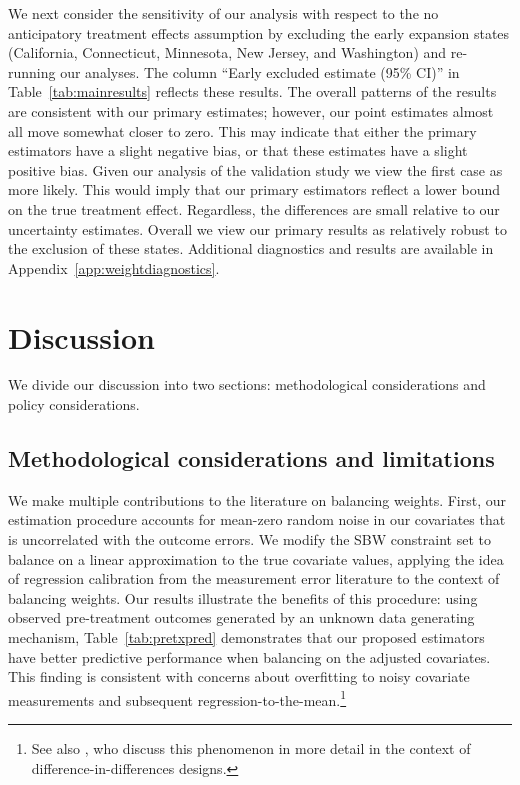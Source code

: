 \documentclass[aoas]{imsart}
\theoremstyle{plain}
\theoremstyle{remark}
\begin{document}
We next consider the sensitivity of our analysis with respect to the no anticipatory treatment effects assumption by excluding the early expansion states (California, Connecticut, Minnesota, New Jersey, and Washington) and re-running our analyses. The column ``Early excluded estimate (95\% CI)'' in Table~\ref{tab:mainresults} reflects these results. The overall patterns of the results are consistent with our primary estimates; however, our point estimates almost all move somewhat closer to zero. This may indicate that either the primary estimators have a slight negative bias, or that these estimates have a slight positive bias. Given our analysis of the validation study we view the first case as more likely. This would imply that our primary estimators reflect a lower bound on the true treatment effect. Regardless, the differences are small relative to our uncertainty estimates. Overall we view our primary results as relatively robust to the exclusion of these states. Additional diagnostics and results are available in Appendix~\ref{app:weightdiagnostics}.

\section{Discussion}

We divide our discussion into two sections: methodological considerations and policy considerations. 

\subsection{Methodological considerations and limitations}

We make multiple contributions to the literature on balancing weights. First, our estimation procedure accounts for mean-zero random noise in our covariates that is uncorrelated with the outcome errors. We modify the SBW constraint set to balance on a linear approximation to the true covariate values, applying the idea of regression calibration from the measurement error literature to the context of balancing weights. Our results illustrate the benefits of this procedure: using observed pre-treatment outcomes generated by an unknown data generating mechanism, Table~\ref{tab:pretxpred} demonstrates that our proposed estimators have better predictive performance when balancing on the adjusted covariates. This finding is consistent with concerns about overfitting to noisy covariate measurements and subsequent regression-to-the-mean.\footnote{See also \cite{daw2018matching}, who discuss this phenomenon in more detail in the context of difference-in-differences designs.}
\end{document}
